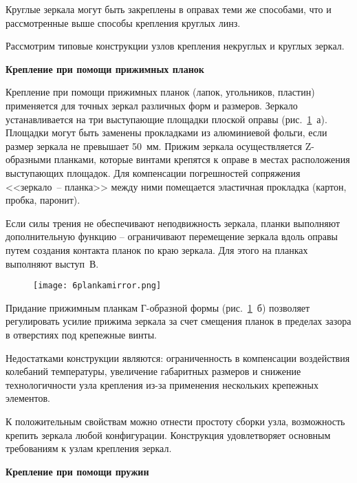 Круглые зеркала могут быть закреплены в оправах теми же способами, что и рассмотренные выше способы крепления круглых линз. 

Рассмотрим типовые конструкции узлов крепления некруглых и круглых зеркал.

\newpage
\begin{flushleft}
	\textbf{Крепление при помощи прижимных планок}
\end{flushleft}

Крепление при помощи прижимных планок (лапок, угольников, пластин) применяется для точных зеркал различных форм и размеров. Зеркало устанавливается на три выступающие площадки плоской оправы (рис.~\ref{pic:6plankamirror}~а). Площадки могут быть заменены прокладками из алюминиевой фольги, если размер зеркала не превышает 50~мм. Прижим зеркала осуществляется Z-образными планками, которые винтами крепятся к оправе в местах расположения выступающих площадок. Для компенсации погрешностей сопряжения <<зеркало~-- планка>> между ними помещается эластичная прокладка (картон, пробка, паронит).

Если силы трения не обеспечивают неподвижность зеркала, планки выполняют дополнительную функцию -- ограничивают перемещение зеркала вдоль оправы путем создания контакта планок по краю зеркала. Для этого на планках выполняют выступ~В.

\begin{figure}[h!]
	\texttt{[image: 6plankamirror.png]}
	\label{pic:6plankamirror}
\end{figure}

Придание прижимным планкам Г-образной формы (рис.~\ref{pic:6plankamirror}~б) позволяет регулировать усилие прижима зеркала за счет смещения планок в пределах зазора в отверстиях под крепежные винты.

Недостатками конструкции являются: ограниченность в компенсации воздействия колебаний температуры, увеличение габаритных размеров и снижение технологичности узла крепления из-за применения нескольких крепежных элементов.

К положительным свойствам можно отнести простоту сборки узла, возможность крепить зеркала любой конфигурации. Конструкция удовлетворяет основным требованиям к узлам крепления зеркал.

\begin{flushleft}
	\textbf{Крепление при помощи пружин}
\end{flushleft}

